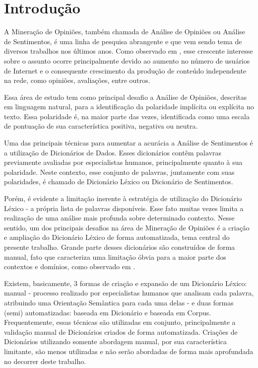 \documentclass[12pt]{article}
\begin{document}
\section{Introdução}
A Mineração de Opiniões, também chamada de Análise de Opiniões ou Análise de Sentimentos, é uma linha de pesquisa abrangente e que vem sendo tema de diversos trabalhos nos últimos anos. Como observado em \cite{liu2010multifaceted}, esse crescente interesse sobre o assunto ocorre principalmente devido ao aumento no número de usuários de Internet e o consequente crescimento da produção de conteúdo independente na rede, como opiniões, avaliações, entre outros. 

Essa área de estudo tem como principal desafio a Análise de Opiniões, descritas em linguagem natural, para a identificação da polaridade implícita ou explícita no texto. Essa polaridade é, na maior parte das vezes, identificada como uma escala de pontuação de sua característica positiva, negativa ou neutra.

Uma das principais técnicas para aumentar a acurácia a Análise de Sentimentos é a utilização de Dicionários de Dados. Esses dicionários contêm palavras previamente avaliadas por especialistas humanos, principalmente quanto à sua polaridade. Neste contexto, esse conjunto de palavras, juntamente com suas polaridades, é chamado de Dicionário Léxico ou Dicionário de Sentimentos. 

Porém, é evidente a limitação inerente à estratégia de utilização do Dicionário Léxico - a própria lista de palavras disponíveis. Esse fato muitas vezes limita a realização de uma análise mais profunda sobre determinado contexto. Nesse sentido, um dos principais desafios na área de Mineração de Opiniões é a criação e ampliação do Dicionário Léxico de forma automatizada, tema central do presente trabalho. Grande parte desses dicionários são construídos de forma manual, fato que caracteriza uma limitação óbvia para a maior parte dos contextos e domínios, como observado em \cite{duwairi2015detecting}. 

Existem, basicamente, 3 formas de criação e expansão de um Dicionário Léxico: manual -  processo realizado por especialistas humanos que analisam cada palavra, atribuindo uma Orientação Semântica para cada uma delas -  e duas formas (semi) automatizadas: baseada em Dicionário e baseada em Corpus. Frequentemente, essas técnicas são utilizadas em conjunto, principalmente a validação manual de Dicionários criados de forma automatizada. Criações de Dicionários utilizando somente abordagem manual, por sua característica limitante, são menos utilizadas e não serão abordadas de forma mais aprofundada no decorrer deste trabalho.
\end{document}
